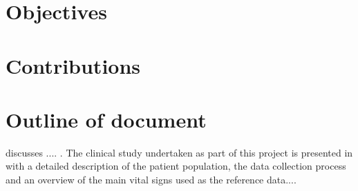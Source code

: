 \lipsum[10-12]\cite{cote1988effect,aravindhan2000sulfhemoglobinemia,clayton1991pulse,clayton1991comparison,webb1991potential,212885,964165,Chaichulee2017FG}

\section{Objectives}

\lipsum[2-4]

\section{Contributions}

\lipsum[2-4]

\section{Outline of document}

 discusses .... . The clinical study undertaken as part of this project is presented in  with a detailed description of the patient population, the data collection process and an overview of the main vital signs used as the reference data....

\lipsum[2-4]
